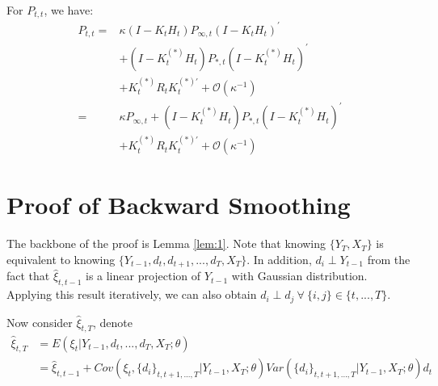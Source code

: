 \documentclass[12pt]{article}
\numberwithin{equation}{section}
\begin{document}
For $P_{t,t}$, we have:
\begin{align}
    P_{t,t} =& \kappa (I-K_tH_t)P_{\infty,t}(I-K_tH_t)^{'} \nonumber \\
    &+ (I-K_t^{(*)}H_t)P_{*,t}(I-K_t^{(*)}H_t)^{'} \nonumber \\
    &+ K_t^{(*)}R_tK_t^{(*)'} + \mathcal{O}(\kappa^{-1}) \nonumber \\
    =& \kappa P_{\infty, t} + (I-K_t^{(*)}H_t)P_{*,t}(I-K_t^{(*)}H_t)^{'} \label{eq:diff_P2} \\
    &+ K_t^{(*)}R_tK_t^{(*)'} + \mathcal{O}(\kappa^{-1}) \nonumber
\end{align}

\section{Proof of Backward Smoothing} \label{ap:smooth}
The backbone of the proof is Lemma \ref{lem:1}. Note that knowing $\{Y_T, X_T\}$ is equivalent to knowing $\{Y_{t-1},d_t,d_{t+1},...,d_T, X_T\}$. In addition, $d_i \perp Y_{t-1}$ from the fact that $\hat{\xi}_{t,t-1}$ is a linear projection of $Y_{t-1}$ with Gaussian distribution. Applying this result iteratively, we can also obtain $d_i \perp d_j \:\forall\: \{i,j\} \in \{t,...,T\}$.

Now consider $\hat{\xi}_{t,T}$, denote 
\begin{align*}
    \hat{\xi}_{t,T} &= E(\xi_t|Y_{t-1},d_{t},...,d_T,X_T;\theta) \\
    &= \hat{\xi}_{t,t-1} + Cov(\xi_t,\{d_i\}_{t,t+1,...,T}|Y_{t-1},X_T;\theta)Var(\{d_i\}_{t,t+1,...,T}|Y_{t-1},X_T;\theta)d_t
\end{align*}
\end{document}
